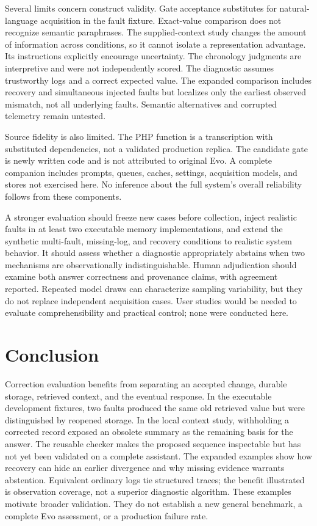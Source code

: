 \documentclass[runningheads]{llncs}
\begin{document}
Several limits concern construct validity. Gate acceptance substitutes for natural-language acquisition in the fault fixture. Exact-value comparison does not recognize semantic paraphrases. The supplied-context study changes the amount of information across conditions, so it cannot isolate a representation advantage. Its instructions explicitly encourage uncertainty. The chronology judgments are interpretive and were not independently scored. The diagnostic assumes trustworthy logs and a correct expected value. The expanded comparison includes recovery and simultaneous injected faults but localizes only the earliest observed mismatch, not all underlying faults. Semantic alternatives and corrupted telemetry remain untested.

Source fidelity is also limited. The PHP function is a transcription with substituted dependencies, not a validated production replica. The candidate gate is newly written code and is not attributed to original Evo. A complete companion includes prompts, queues, caches, settings, acquisition models, and stores not exercised here. No inference about the full system's overall reliability follows from these components.

A stronger evaluation should freeze new cases before collection, inject realistic faults in at least two executable memory implementations, and extend the synthetic multi-fault, missing-log, and recovery conditions to realistic system behavior. It should assess whether a diagnostic appropriately abstains when two mechanisms are observationally indistinguishable. Human adjudication should examine both answer correctness and provenance claims, with agreement reported. Repeated model draws can characterize sampling variability, but they do not replace independent acquisition cases. User studies would be needed to evaluate comprehensibility and practical control; none were conducted here.

\section{Conclusion}
Correction evaluation benefits from separating an accepted change, durable storage, retrieved context, and the eventual response. In the executable development fixtures, two faults produced the same old retrieved value but were distinguished by reopened storage. In the local context study, withholding a corrected record exposed an obsolete summary as the remaining basis for the answer. The reusable checker makes the proposed sequence inspectable but has not yet been validated on a complete assistant. The expanded examples show how recovery can hide an earlier divergence and why missing evidence warrants abstention. Equivalent ordinary logs tie structured traces; the benefit illustrated is observation coverage, not a superior diagnostic algorithm. These examples motivate broader validation. They do not establish a new general benchmark, a complete Evo assessment, or a production failure rate.
\end{document}
